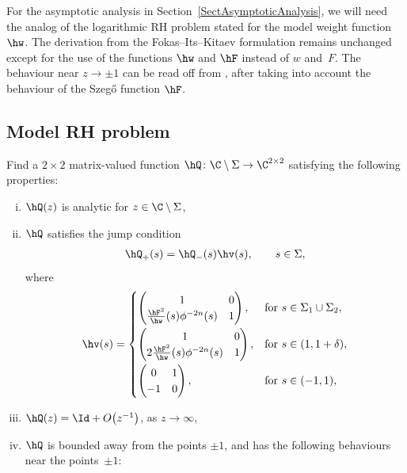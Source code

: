 For the asymptotic analysis in Section~\ref{SectAsymptoticAnalysis}, we will need the analog of the logarithmic RH problem stated for the model weight function $\hw$. The derivation from the Fokas--Its--Kitaev formulation remains unchanged except for the use of the functions $\hw$ and $\hF$ instead of $w$ and~$F$. The behaviour near $z \to \pm1$ can be read off from \cite[Section~4]{KMVV}, after taking into account the behaviour of the Szeg\H{o} function $\hF$.

\subsection{Model RH problem}\label{ModRHP} Find a $2\times2$ matrix-valued function $\hQ \colon \C \setminus \Sigma \to \C^{2\times2}$ satisfying the following properties:
\begin{enumerate}[(i)]\itemsep=0pt
 \item $\hQ(z)$ is analytic for $z \in \C \setminus \Sigma$,
 \item $\hQ$ satisfies the jump condition
 \begin{align*}
 \hQ_+(s) = \hQ_-(s) \hv(s), \qquad s\in \Sigma,
 \end{align*}
 where
 \begin{align}\label{jumpMatrixhV}
\hv(s) =
\begin{cases}
\begin{pmatrix}
1 & 0
\\
\frac{\hF^2}{\hw}(s) \phi^{-2n}(s) & 1
\end{pmatrix}, & \mbox{for}\ s \in \Sigma_1 \cup \Sigma_2,\vspace{1mm}
\\
\begin{pmatrix}
1 & 0
\\
2\frac{\hF^2}{\hw}(s) \phi^{-2n}(s) & 1
\end{pmatrix}, & \mbox{for}\ s\in(1,1+\delta),\vspace{1mm}
\\
\begin{pmatrix}
0 & 1
\\
-1 & 0
\end{pmatrix}, &\mbox{for}\ s \in (-1,1),
\end{cases}
\end{align}
\item $\hQ(z) = \Id + O\big(z^{-1}\big)$, as $z \rightarrow \infty$,
\item $\hQ$ is bounded away from the points $\pm 1$, and has the following behaviours near the points~$\pm1$:

\end{enumerate}
